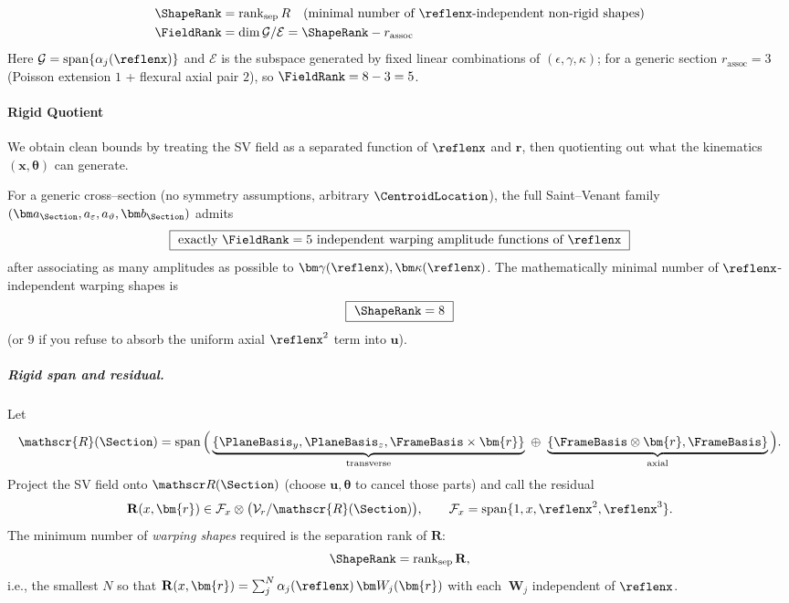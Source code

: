 \[
\begin{aligned}
\ShapeRank&=\operatorname{rank}_{\mathrm{sep}} R
\quad\text{(minimal number of \(\reflenx\)-independent non‑rigid shapes)}\\
\FieldRank&=\dim \mathcal G/\mathcal E=\ShapeRank-r_{\mathrm{assoc}}
\end{aligned}
\]
Here \(\mathcal G=\mathrm{span}\{\alpha_j(\reflenx)\}\) and \(\mathcal E\) is the subspace generated by fixed linear combinations of \((\epsilon,\gamma,\kappa)\);
for a generic section \(r_{\mathrm{assoc}}=3\) (Poisson extension \(1\) + flexural axial pair \(2\)), so \(\FieldRank=8-3=5\).

\paragraph{Rigid Quotient}

We obtain clean bounds by treating the SV field as a separated function of \(\reflenx\) and \(\bm{r}\), then quotienting out what the kinematics \((\bm x,\bm\theta)\) can generate.

\begin{proposition}\label{prop:min8}
For a generic cross–section (no symmetry assumptions, arbitrary \(\CentroidLocation\)), the full Saint–Venant family
\((\bm a_{\Section},a_\varepsilon,a_\vartheta,\bm b_{\Section})\) admits
\[
\boxed{\ \text{exactly } \FieldRank = 5\ \text{independent warping amplitude functions of }\reflenx\ }
\]
after associating as many amplitudes as possible to \(\bm\gamma(\reflenx),\bm\kappa(\reflenx)\).
The mathematically minimal number of \(\reflenx\)-independent warping shapes is
\[
\boxed{\ \ShapeRank=8\ }
\]
(or \(9\) if you refuse to absorb the uniform axial \(\reflenx^2\) term into \(\bm u\)).
\end{proposition}

\subparagraph{Rigid span and residual.}
Let
\[
\mathscr{R}(\Section)
=\operatorname{span}\Big(\underbrace{\{\PlaneBasis_y,\PlaneBasis_z,\FrameBasis\times\bm{r}\}}_{\text{transverse}}\ \oplus\ 
\underbrace{\{\FrameBasis\otimes\bm{r},\FrameBasis\}}_{\text{axial}}\Big).
\]
Project the SV field onto \(\mathscr R(\Section)\) (choose \(\bm u,\bm\theta\) to cancel those parts) and call the residual
\[
\mathbf{R}(x,\bm{r}) \in \mathcal{F}_x \otimes \big(\mathcal{V}_r / \mathscr{R}(\Section)\big),
\qquad \mathcal{F}_x=\mathrm{span}\{1,x,\reflenx^2,\reflenx^3\}.
\]
The minimum number of \emph{warping shapes} required is the separation rank of \(\mathbf R\):
\[
\ShapeRank=\operatorname{rank}_\text{sep}\mathbf R,
\]
i.e., the smallest \(N\) so that \(\mathbf R(x,\bm{r})=\sum_{j}^N \alpha_j(\reflenx)\,\bm W_j(\bm{r})\) with each \(\
\bm W_j\) independent of \(\reflenx\).

